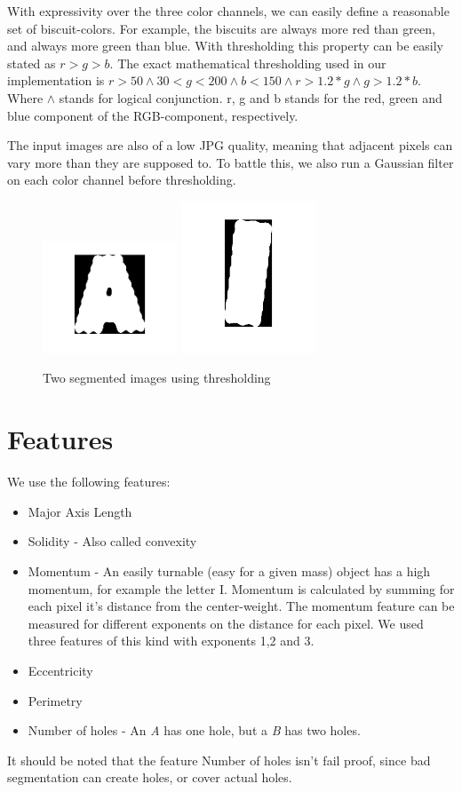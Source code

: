 \documentclass[a4paper,11pt]{article}
\begin{document}
With expressivity over the three color channels, 
we can easily define a reasonable set of biscuit-colors.
For example, the biscuits are always more red than green, and always more green than blue.
With thresholding this property can be easily stated as $r>g>b$.
The exact mathematical thresholding used in our implementation is
$ r > 50 \wedge 30 < g < 200 \wedge b < 150 \wedge r > 1.2*g \wedge g > 1.2*b $.
Where $\wedge$ stands for logical conjunction. r, g and b stands for the red, green and blue component of the RGB-component, respectively.

The input images are also of a low JPG quality, meaning that adjacent pixels can vary more than they are supposed to.
To battle this, we also run a Gaussian filter on each color channel before thresholding.


\begin{figure}[]
\begin{center}
\includegraphics[width=40mm]{seg_a.png}
\includegraphics[width=40mm]{seg_i.png}
\end{center}
\caption{Two segmented images using thresholding}
\label{fig:segmented}
\end{figure}


\section{Features}
We use the following features:
\begin{itemize}
\item Major Axis Length
\item Solidity - Also called convexity
\item Momentum - An easily turnable (easy for a given mass) object has a high momentum, for example the letter I. Momentum is calculated by summing for each pixel it's distance from the center-weight. The momentum feature can be measured for different exponents on the distance for each pixel. We used three features of this kind with exponents 1,2 and 3.
\item Eccentricity
\item Perimetry
\item Number of holes - An \emph{A} has one hole, but a \emph{B} has two holes.
\end{itemize}
It should be noted that the feature Number of holes isn't fail proof,
since bad segmentation can create holes, or cover actual holes.
\end{document}

